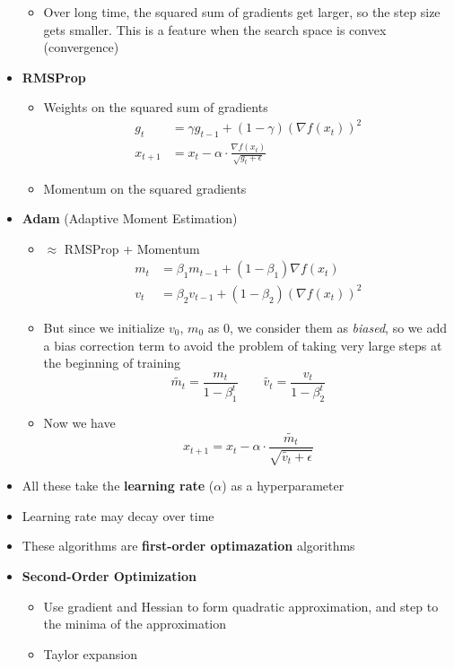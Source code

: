 \begin{itemize}
\begin{itemize}
		\item Over long time, the squared sum of gradients get larger, so the step size gets smaller. This is a feature when the search space is convex (convergence)
	\end{itemize}
	\item \textbf{RMSProp}
	\begin{itemize}
		\item Weights on the squared sum of gradients
		$$\begin{aligned}
		g_{t} &= \gamma g_{t-1} + (1-\gamma) \left(\nabla f(x_t)\right)^2\\
		x_{t + 1} &= x_t - \alpha\cdot \frac{\nabla f(x_t)}{\sqrt{g_t + \epsilon}}
		\end{aligned}$$
		\item Momentum on the squared gradients
	\end{itemize}
	\item \textbf{Adam} (Adaptive Moment Estimation)
	\begin{itemize}
		\item $\approx$ RMSProp + Momentum
		$$\begin{aligned}
		m_t &= \beta_1 m_{t-1} + (1-\beta_1) \nabla f(x_t)\\
		v_t &= \beta_2 v_{t-1} + (1-\beta_2) \left(\nabla f(x_t)\right)^2
		\end{aligned}$$
		\item But since we initialize $v_0$, $m_0$ as $0$, we consider them as \textit{biased}, so we add a bias correction term to avoid the problem of taking very large steps at the beginning of training
		$$
			\widetilde{m_t} = \frac{m_t}{1-\beta_1^t} \qquad \widetilde{v_t} = \frac{v_t}{1-\beta_2^t}
		$$
		\item Now we have
		$$x_{t+1} = x_t - \alpha \cdot \frac{\widetilde{m_t}}{\sqrt{\widetilde{v_t} + \epsilon}}$$
	\end{itemize}
	\item All these take the \textbf{learning rate} ($\alpha$) as a hyperparameter
	\item Learning rate may decay over time
	\item These algorithms are \textbf{first-order optimazation} algorithms
	\item \textbf{Second-Order Optimization}
	\begin{itemize}
		\item Use gradient and Hessian to form quadratic approximation, and step to the minima of the approximation
		\item Taylor expansion

\end{itemize}
\end{itemize}
